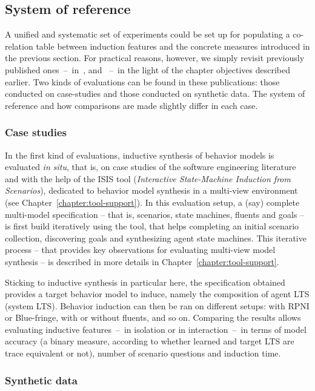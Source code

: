 \subsection{System of reference}

A unified and systematic set of experiments could be set up for populating a co-relation table between induction features and the concrete measures introduced in the previous section. For practical reasons, however, we simply revisit previously published ones~--~in~\cite{Damas:2006}, \cite{Dupont:2008} and \cite{Lambeau:2008}~--~in the light of the chapter objectives described earlier. Two kinds of evaluations can be found in these publications: those conducted on case-studies and those conducted on synthetic data. The system of reference and how comparisons are made slightly differ in each case.

\subsubsection*{Case studies}

In the first kind of evaluations, inductive synthesis of behavior models is evaluated \emph{in situ}, that is, on case studies of the software engineering literature and with the help of the ISIS tool (\emph{Interactive State-Machine Induction from Scenarios}), dedicated to behavior model synthesis in a multi-view environment (see Chapter~\ref{chapter:tool-support}). In this evaluation setup, a (say) complete multi-model specification -- that is, scenarios, state machines, fluents and goals -- is first build iteratively using the tool, that helps completing an initial scenario collection, discovering goals and synthesizing agent state machines. This iterative process -- that provides key observations for evaluating multi-view model synthesis -- is described in more details in Chapter~\ref{chapter:tool-support}. 

Sticking to inductive synthesis in particular here, the specification obtained provides a target behavior model to induce, namely the composition of agent LTS (system LTS).  Behavior induction can then be ran on different setups: with RPNI or Blue-fringe, with or without fluents, and so on. Comparing the results allows evaluating inductive features~--~in isolation or in interaction~--~in terms of model accuracy (a binary measure, according to whether learned and target LTS are trace equivalent or not), number of scenario questions and induction time.

\subsubsection*{Synthetic data}

